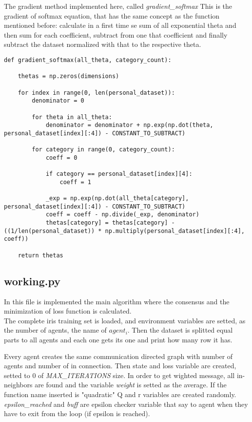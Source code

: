 \documentclass[a4paper,11pt,oneside]{book}
\begin{document}
The gradient method implemented here, called \textit{gradient\_softmax} This is the gradient of softmax equation, that has
the same concept as the function mentioned before: calculate in a first time se sum of all exponential theta and then sum for
each coefficient, subtract from one that coefficient and finally subtract the dataset normalized with that to the respective
theta.

\begin{lstlisting}
def gradient_softmax(all_theta, category_count):

    thetas = np.zeros(dimensions)

    for index in range(0, len(personal_dataset)):
        denominator = 0

        for theta in all_theta:
            denominator = denominator + np.exp(np.dot(theta, personal_dataset[index][:4]) - CONSTANT_TO_SUBTRACT)

        for category in range(0, category_count):
            coeff = 0

            if category == personal_dataset[index][4]:
                coeff = 1

            _exp = np.exp(np.dot(all_theta[category], personal_dataset[index][:4]) - CONSTANT_TO_SUBTRACT)
            coeff = coeff - np.divide(_exp, denominator)
            thetas[category] = thetas[category] - ((1/len(personal_dataset)) * np.multiply(personal_dataset[index][:4], coeff))

    return thetas
\end{lstlisting}

\subsection {working.py}

In this file is implemented the main algorithm where the consensus and the minimization of loss function is calculated.\\

The complete iris training set is loaded, and environment variables are setted, as the number of agents, the name of $agent_{i
}$. Then the dataset is splitted equal parts to all agents and each one gets its one and print how many row it has.

Every agent creates the same communication directed graph with number of agents and number of in connection. Then state and
loss variable are created, setted to 0 of \textit{MAX\_ITERATIONS} size. In order to get wighted message, all in-neighbors
are found and the variable \textit{weight} is setted as the average. If the function name inserted is "quadratic" Q and r
variables are created randomly. \textit{epsilon\_reached} and \textit{buff} are epsilon checker variable that say to agent
when they have to exit from the loop (if epsilon is reached).
\end{document}
